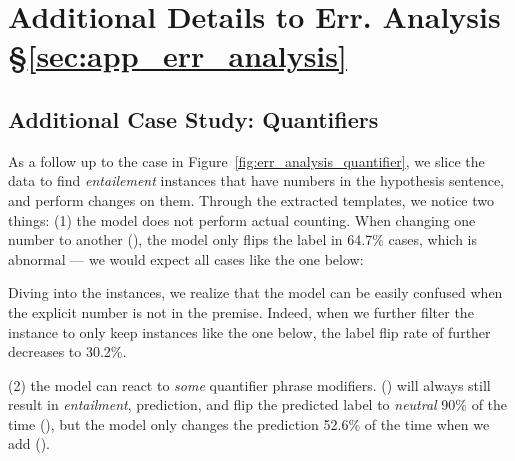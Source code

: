 \section{Additional Details to Err. Analysis \S\ref{sec:app_err_analysis}}
\label{appendix:err_analysis}

\subsection{Additional Case Study: Quantifiers}
\label{appendix:err_analysis_quantifier_case}



As a follow up to the case in Figure~\ref{fig:err_analysis_quantifier}, we slice the data to find \emph{entailement} instances that have numbers in the hypothesis sentence, and perform  changes on them.
Through the extracted templates, we notice two things: 
(1) the model does not perform actual counting. 
When changing one number to another (), the model only flips the label in 64.7\% cases, which is abnormal --- we would expect all cases like the one below:


Diving into the instances, we realize that the model can be easily confused when the explicit number is not in the premise. Indeed, when we further filter the instance to only keep instances like the one below, the label flip rate of  further decreases to 30.2\%.


(2) the model can react to \emph{some} quantifier phrase modifiers. 
 () will always still result in \emph{entailment}, prediction,  and  flip the predicted label to \emph{neutral} 90\% of the time (), but the model only changes the prediction 52.6\% of the time when we add  ().


